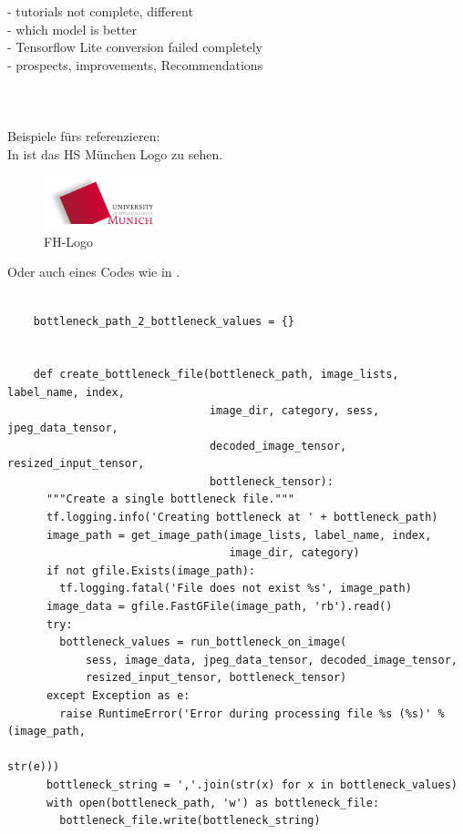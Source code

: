 - tutorials not complete, different \\
- which model is better \\
- Tensorflow Lite conversion failed completely \\
- prospects, improvements, Recommendations \\
\\
\\ \\
Beispiele fürs referenzieren: \\
In  ist das HS München Logo zu sehen.

\begin{figure}[htbp]
\includegraphics[width=0.3\textwidth]{includes/MUASlogo}
\caption{FH-Logo}
\label{fig:FH-Logo}
\end{figure}

Oder auch eines Codes wie in  .\\
\begin{lstlisting}[caption=Some python code, label=list:python_Code]

	bottleneck_path_2_bottleneck_values = {}


	def create_bottleneck_file(bottleneck_path, image_lists, label_name, index,
	                           image_dir, category, sess, jpeg_data_tensor,
	                           decoded_image_tensor, resized_input_tensor,
	                           bottleneck_tensor):
	  """Create a single bottleneck file."""
	  tf.logging.info('Creating bottleneck at ' + bottleneck_path)
	  image_path = get_image_path(image_lists, label_name, index,
	                              image_dir, category)
	  if not gfile.Exists(image_path):
	    tf.logging.fatal('File does not exist %s', image_path)
	  image_data = gfile.FastGFile(image_path, 'rb').read()
	  try:
	    bottleneck_values = run_bottleneck_on_image(
	        sess, image_data, jpeg_data_tensor, decoded_image_tensor,
	        resized_input_tensor, bottleneck_tensor)
	  except Exception as e:
	    raise RuntimeError('Error during processing file %s (%s)' % (image_path,
	                                                                 str(e)))
	  bottleneck_string = ','.join(str(x) for x in bottleneck_values)
	  with open(bottleneck_path, 'w') as bottleneck_file:
	    bottleneck_file.write(bottleneck_string)
\end{lstlisting}

